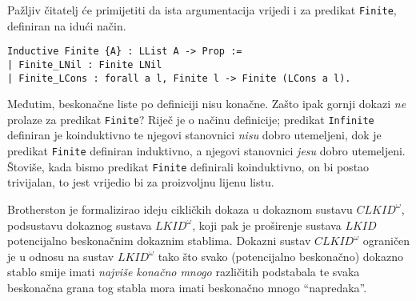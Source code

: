 Pažljiv čitatelj će primijetiti da ista argumentacija vrijedi
i za predikat \texttt{Finite}, definiran na idući način.
\begin{verbatim}
Inductive Finite {A} : LList A -> Prop :=
| Finite_LNil : Finite LNil
| Finite_LCons : forall a l, Finite l -> Finite (LCons a l).
\end{verbatim}
\noindent Međutim, beskonačne liste po definiciji nisu konačne.
Zašto ipak gornji dokazi \textit{ne} prolaze za predikat \texttt{Finite}?
Riječ je o načinu definicije; predikat \texttt{Infinite} definiran je koinduktivno
te njegovi stanovnici \textit{nisu} dobro utemeljeni,
dok je predikat \texttt{Finite} definiran induktivno, a njegovi stanovnici \textit{jesu}
dobro utemeljeni. Štoviše, kada bismo predikat \texttt{Finite} definirali koinduktivno,
on bi postao trivijalan, to jest vrijedio bi za proizvoljnu lijenu listu.


Brotherston je formalizirao ideju cikličkih dokaza u dokaznom sustavu
\(\mathit{CLKID}^{\omega}\), podsustavu dokaznog sustava \(\mathit{LKID}^{\omega}\),
koji pak je proširenje sustava \(\mathit{LKID}\) potencijalno beskonačnim dokaznim stablima.
Dokazni sustav \(\mathit{CLKID}^{\omega}\) ograničen je u odnosu na sustav \(\mathit{LKID}^{\omega}\)
tako što svako (potencijalno beskonačno) dokazno stablo
smije imati \textit{najviše konačno mnogo} različitih podstabala te
svaka beskonačna grana tog stabla mora imati beskonačno mnogo \enquote{napredaka}.





